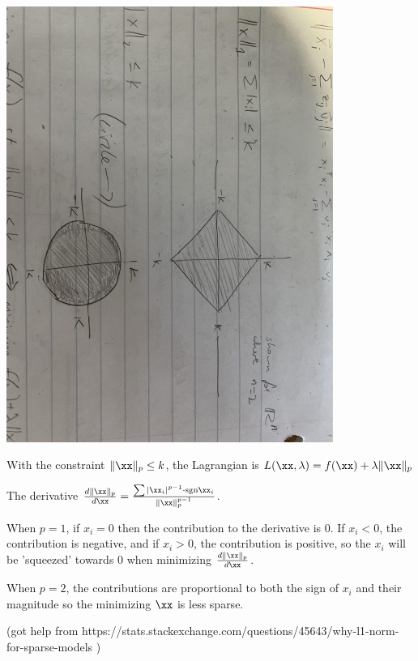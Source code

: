 \documentclass[12pt,letterpaper,fleqn]{hmcpset}
\begin{document}
\begin{solution}
    \includegraphics[width=0.8\textwidth, angle=90]{norm}

    With the constraint $\|\xx\|_p \leq k$, the Lagrangian is $L(\xx, \lambda) = f(\xx) + \lambda \|\xx\|_p$

    The derivative $\frac{d\|\xx\|_p}{d\xx} = \frac{\sum |\xx_i|^{p-1} \cdot \text{sgn} \xx_i}{\|\xx\|_p^{p-1}}$.

    When $p=1$, if $x_i = 0$ then the contribution to the derivative is 0. If $x_i < 0$, the contribution is negative, and if $x_i > 0$, the contribution is positive, so the $x_i$ will be 'squeezed' towards 0 when minimizing $\frac{d\|\xx\|_p}{d\xx}$.

    When $p=2$, the contributions are proportional to both the sign of $x_i$ and their magnitude so the minimizing $\xx$ is less sparse.

    (got help from https://stats.stackexchange.com/questions/45643/why-l1-norm-for-sparse-models )
\end{solution}
\newpage
\end{document}
